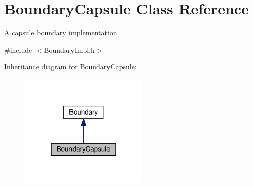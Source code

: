 \hypertarget{classBoundaryCapsule}{\section{Boundary\+Capsule Class Reference}
\label{classBoundaryCapsule}
}


A capsule boundary implementation.  




{\ttfamily \#include $<$Boundary\+Impl.\+h$>$}



Inheritance diagram for Boundary\+Capsule\+:
\nopagebreak
\begin{figure}[H]
\begin{center}
\leavevmode
\includegraphics[width=175pt]{classBoundaryCapsule__inherit__graph}
\end{center}
\end{figure}


